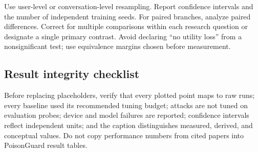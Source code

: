 Use user-level or conversation-level resampling. Report confidence intervals and the number of independent training seeds. For paired branches, analyze paired differences. Correct for multiple comparisons within each research question or designate a single primary contrast. Avoid declaring ``no utility loss'' from a nonsignificant test; use equivalence margins chosen before measurement.

\subsection{Result integrity checklist}

Before replacing placeholders, verify that every plotted point maps to raw runs; every baseline used its recommended tuning budget; attacks are not tuned on evaluation probes; device and model failures are reported; confidence intervals reflect independent units; and the caption distinguishes measured, derived, and conceptual values. Do not copy performance numbers from cited papers into PoisonGuard result tables.
